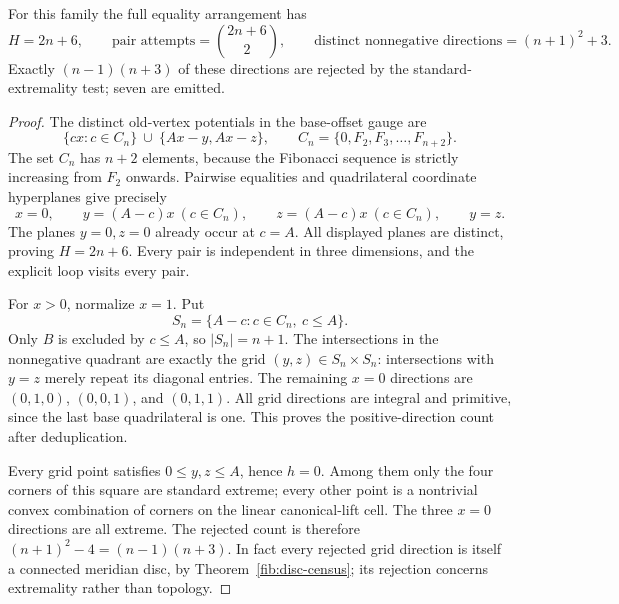 \begin{proposition}
\label{fib:legacy-counts}
For this family the full equality arrangement has
\begin{equation}
 H=2n+6,\qquad
 \text{pair attempts}=\binom{2n+6}{2},\qquad
 \text{distinct nonnegative directions}=(n+1)^2+3.
 \label{fib:legacy-numbers}
\end{equation}
Exactly \((n-1)(n+3)\) of these directions are rejected by the
standard-extremality test; seven are emitted.
\end{proposition}
\begin{proof}
The distinct old-vertex potentials in the base-offset gauge are
\[
 \{cx:c\in C_n\}\ \cup\ \{Ax-y,Ax-z\},\qquad
 C_n=\{0,F_2,F_3,\ldots,F_{n+2}\}.
\]
The set \(C_n\) has \(n+2\) elements, because the Fibonacci sequence
is strictly increasing from \(F_2\) onwards.  Pairwise equalities and
quadrilateral coordinate hyperplanes give precisely
\begin{equation}
 x=0,\qquad y=(A-c)x\ (c\in C_n),\qquad
 z=(A-c)x\ (c\in C_n),\qquad y=z.
 \label{fib:all-planes}
\end{equation}
The planes \(y=0,z=0\) already occur at \(c=A\).  All displayed
planes are distinct, proving \(H=2n+6\).  Every pair is independent
in three dimensions, and the explicit loop visits every pair.

For \(x>0\), normalize \(x=1\).  Put
\[
 S_n=\{A-c:c\in C_n,\ c\leq A\}.
\]
Only \(B\) is excluded by \(c\leq A\), so \(|S_n|=n+1\).
The intersections in the nonnegative quadrant are exactly the grid
\((y,z)\in S_n\times S_n\): intersections with \(y=z\) merely
repeat its diagonal entries.  The remaining \(x=0\) directions are
\((0,1,0)\), \((0,0,1)\), and \((0,1,1)\).
All grid directions are integral and primitive, since the last base
quadrilateral is one.  This proves the positive-direction count after
deduplication.

Every grid point satisfies \(0\leq y,z\leq A\), hence \(h=0\).
Among them only the four corners of this square are standard extreme;
every other point is a nontrivial convex combination of corners on the
linear canonical-lift cell.  The three \(x=0\) directions are all
extreme.  The rejected count is therefore
\((n+1)^2-4=(n-1)(n+3)\).  In fact every rejected grid direction is
itself a connected meridian disc, by Theorem~\ref{fib:disc-census};
its rejection concerns extremality rather than topology.
\end{proof}

